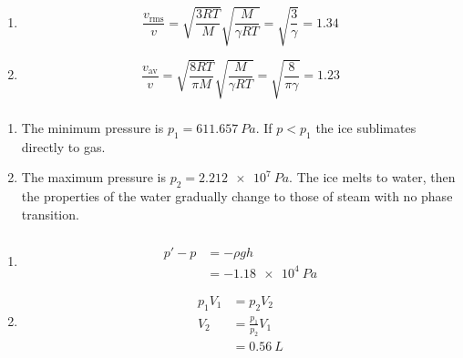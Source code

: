 \documentclass{article}
\begin{document}
\begin{enumerate}
  \item \[\frac{v_\text{rms}}{v} = \sqrt{\frac{3 R T}{M}} \sqrt{\frac{M}{\gamma R T}} = \sqrt{\frac{3}{\gamma}} = 1.34\]

  \item \[\frac{v_\text{av}}{v} = \sqrt{\frac{8 R T}{\pi M}} \sqrt{\frac{M}{\gamma R T}} = \sqrt{\frac{8}{\pi \gamma}} = 1.23\]
\end{enumerate}

\setcounter{subsubsection}{44}
\subsubsection{}

\begin{enumerate}
  \item The minimum pressure is $p_1 = \qty{611.657}{Pa}$. If $p < p_1$ the ice sublimates directly to gas.

  \item The maximum pressure is $p_2 = \qty{2.212e7}{Pa}$. The ice melts to water, then the properties of the water gradually change to those of steam with no phase transition.
\end{enumerate}

\setcounter{subsubsection}{48}
\subsubsection{}

\begin{enumerate}
  \item

        \begin{align*}
          p' - p & = -\rho g h         \\
                 & = -\qty{1.18e4}{Pa}
        \end{align*}

  \item

        \begin{align*}
          p_1 V_1 & = p_2 V_2             \\
          V_2     & = \frac{p_1}{p_2} V_1 \\
                  & = \qty{0.56}{L}
        \end{align*}
\end{enumerate}
\end{document}
